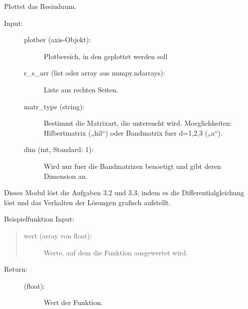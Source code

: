 \documentclass[letterpaper,10pt,ngerman]{sphinxmanual}
\begin{document}
\begin{fulllineitems}
\label{\detokenize{index:aufg_3_4_main.plot_res}}
Plottet das  Resiuduum.
\begin{description}
\item[{Input:}] \leavevmode\begin{description}
\item[{plotber (axis-Objekt):}] \leavevmode
Plotbereich, in den geplottet werden soll

\item[{r\_s\_arr (list oder array aus numpy.ndarrays):}] \leavevmode
Liste aus rechten Seiten.

\item[{matr\_type (string):}] \leavevmode
Bestimmt die Matrixart, die untersucht wird.
Moeglichkeiten: Hilbertmatrix („hil“) oder
Bandmatrix fuer d=1,2,3 („a“).

\item[{dim (int, Standard: 1):}] \leavevmode
Wird nur fuer die Bandmatrizen benoetigt und gibt deren Dimension an.

\end{description}

\end{description}

\end{fulllineitems}

\label{\detokenize{index:module-aufg_3_2u3_main}}
Dieses Modul löst die Aufgaben 3.2 und 3.3, indem es die Differentialgleichung löst und
das Verhalten der Lösungen grafisch aufstellt.

\begin{fulllineitems}
\label{\detokenize{index:aufg_3_2u3_main.fntn}}
Beispielfunktion
Input:
\begin{quote}
\begin{description}
\item[{wert (array von float):}] \leavevmode
Werte, auf dem die Funktion ausgewertet wird.

\end{description}
\end{quote}
\begin{description}
\item[{Return:}] \leavevmode\begin{description}
\item[{(float):}] \leavevmode
Wert der Funktion.

\end{description}

\end{description}

\end{fulllineitems}
\end{document}

